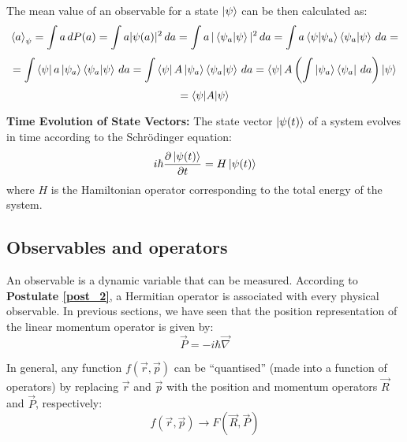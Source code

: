 \begin{postulate}
\begin{itemize}
        The mean value of an observable for a state $\ket{\psi}$ can be then calculated as:
        \begin{equation*}
            \braket{a}_\psi = \int a\, dP(a) = \int a|\psi(a)|^2\,da = \int a\,|\braket{\psi_a|\psi}|^2\,da = \int a\braket{\psi|\psi_a}\braket{\psi_a|\psi}\,da = 
        \end{equation*}
        \begin{equation*}
            = \int \bra{\psi}a\ket{\psi_a}\braket{\psi_a|\psi}\,da = \int \bra{\psi}A\ket{\psi_a}\braket{\psi_a|\psi}\,da = \bra{\psi}A\left(\int\ket{\psi_a}\bra{\psi_a}\,da\right)\ket{\psi}
        \end{equation*}
        \begin{equation}
            = \braket{\psi|A|\psi}
        \end{equation}

    \end{itemize}
\end{postulate}

\begin{postulate} \label{post_5}
    \textbf{Time Evolution of State Vectors:} The state vector $\ket{\psi(t)}$ of a system evolves in time according to the Schrödinger equation:
    \begin{equation}
        i\hbar\frac{\partial \ket{\psi(t)}}{\partial t} = H\ket{\psi(t)}
    \end{equation}
    where $H$ is the Hamiltonian operator corresponding to the total energy of the system.
\end{postulate}

\subsection{Observables and operators} \label{observables_and_operators}

An observable is a dynamic variable that can be measured. According to \textbf{Postulate \ref{post_2}}, a Hermitian operator is associated with every physical observable. In previous sections, we have seen that the position representation of the linear momentum operator is given by:
\begin{equation}
    \vec{P} = -i\hbar\vec{\nabla}
\end{equation}

In general, any function $f(\vec{r}, \vec{p})$ can be ``quantised'' (made into a function of operators) by replacing $\vec{r}$ and $\vec{p}$ with the position and momentum operators $\vec{R}$ and $\vec{P}$, respectively:
\begin{equation}
    f(\vec{r}, \vec{p}) \rightarrow F(\vec{R}, \vec{P})
\end{equation}

